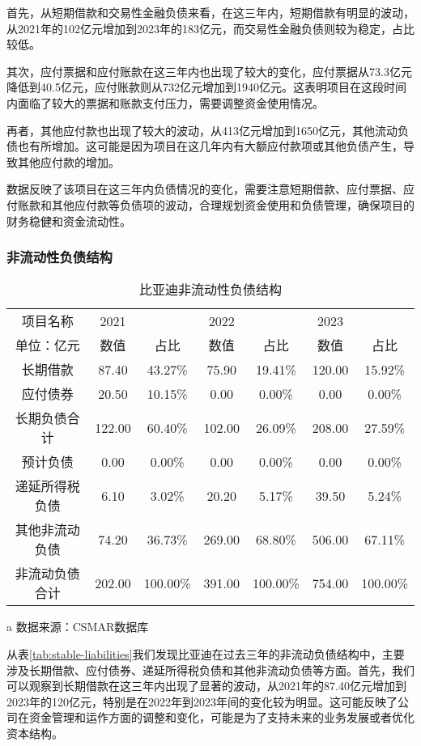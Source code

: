 首先，从短期借款和交易性金融负债来看，在这三年内，短期借款有明显的波动，从2021年的102亿元增加到2023年的183亿元，而交易性金融负债则较为稳定，占比较低。

其次，应付票据和应付账款在这三年内也出现了较大的变化，应付票据从73.3亿元降低到40.5亿元，应付账款则从732亿元增加到1940亿元。这表明项目在这段时间内面临了较大的票据和账款支付压力，需要调整资金使用情况。

再者，其他应付款也出现了较大的波动，从413亿元增加到1650亿元，其他流动负债也有所增加。这可能是因为项目在这几年内有大额应付款项或其他负债产生，导致其他应付款的增加。

数据反映了该项目在这三年内负债情况的变化，需要注意短期借款、应付票据、应付账款和其他应付款等负债项的波动，合理规划资金使用和负债管理，确保项目的财务稳健和资金流动性。
\subsubsection{非流动性负债结构}
\begin{table}
  \centering
  \begin{threeparttable}[c]
    \caption{比亚迪非流动性负债结构}
    \label{tab:stable-liabilities}
    \begin{tabular}{ccccccc}
      \toprule
      项目名称 & 2021 & ~ & 2022 & ~ & 2023 & ~ \\ 
        单位：亿元 & 数值 & 占比 & 数值 & 占比 & 数值 & 占比 \\ 
      \midrule
        长期借款 & 87.40  & 43.27\% & 75.90  & 19.41\% & 120.00  & 15.92\% \\ 
        应付债券 & 20.50  & 10.15\% & 0.00  & 0.00\% & 0.00  & 0.00\% \\ 
        长期负债合计 & 122.00  & 60.40\% & 102.00  & 26.09\% & 208.00  & 27.59\% \\ 
        预计负债 & 0.00  & 0.00\% & 0.00  & 0.00\% & 0.00  & 0.00\% \\ 
        递延所得税负债 & 6.10  & 3.02\% & 20.20  & 5.17\% & 39.50  & 5.24\% \\ 
        其他非流动负债 & 74.20  & 36.73\% & 269.00  & 68.80\% & 506.00  & 67.11\% \\ 
        非流动负债合计 & 202.00  & 100.00\% & 391.00  & 100.00\% & 754.00  & 100.00\% \\ 
      \bottomrule
    \end{tabular}
    \begin{tablenotes}
      \item [a] 数据来源：CSMAR数据库
    \end{tablenotes}
  \end{threeparttable}
\end{table}
从表\eqref{tab:stable-liabilities}我们发现比亚迪在过去三年的非流动负债结构中，主要涉及长期借款、应付债券、递延所得税负债和其他非流动负债等方面。首先，我们可以观察到长期借款在这三年内出现了显著的波动，从2021年的87.40亿元增加到2023年的120亿元，特别是在2022年到2023年间的变化较为明显。这可能反映了公司在资金管理和运作方面的调整和变化，可能是为了支持未来的业务发展或者优化资本结构。

